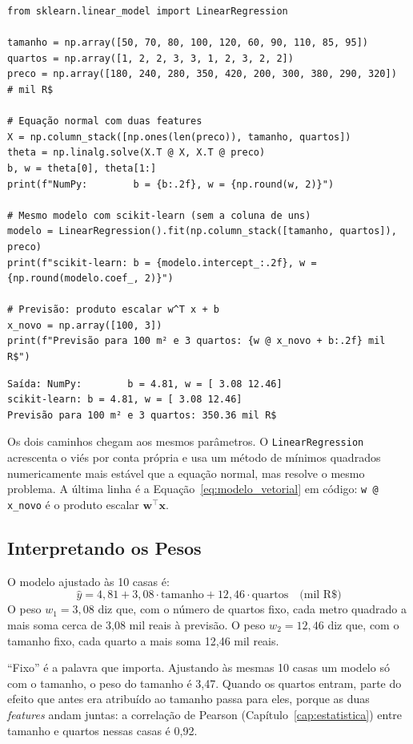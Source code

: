 \documentclass[a4paper,12pt,openany]{book}
\begin{document}
\begin{verbatim}
from sklearn.linear_model import LinearRegression

tamanho = np.array([50, 70, 80, 100, 120, 60, 90, 110, 85, 95])
quartos = np.array([1, 2, 2, 3, 3, 1, 2, 3, 2, 2])
preco = np.array([180, 240, 280, 350, 420, 200, 300, 380, 290, 320])  # mil R$

# Equação normal com duas features
X = np.column_stack([np.ones(len(preco)), tamanho, quartos])
theta = np.linalg.solve(X.T @ X, X.T @ preco)
b, w = theta[0], theta[1:]
print(f"NumPy:        b = {b:.2f}, w = {np.round(w, 2)}")

# Mesmo modelo com scikit-learn (sem a coluna de uns)
modelo = LinearRegression().fit(np.column_stack([tamanho, quartos]), preco)
print(f"scikit-learn: b = {modelo.intercept_:.2f}, w = {np.round(modelo.coef_, 2)}")

# Previsão: produto escalar w^T x + b
x_novo = np.array([100, 3])
print(f"Previsão para 100 m² e 3 quartos: {w @ x_novo + b:.2f} mil R$")
\end{verbatim}
\begin{verbatim}
Saída: NumPy:        b = 4.81, w = [ 3.08 12.46]
scikit-learn: b = 4.81, w = [ 3.08 12.46]
Previsão para 100 m² e 3 quartos: 350.36 mil R$
\end{verbatim}

Os dois caminhos chegam aos mesmos parâmetros. O \texttt{LinearRegression} acrescenta o viés por conta própria e usa um método de mínimos quadrados numericamente mais estável que a equação normal, mas resolve o mesmo problema. A última linha é a Equação~\ref{eq:modelo_vetorial} em código: \texttt{w @ x\_novo} é o produto escalar \(\mathbf{w}^\top\mathbf{x}\).

\subsection{Interpretando os Pesos}

O modelo ajustado às 10 casas é:
\[
\hat{y} = 4,81 + 3,08 \cdot \text{tamanho} + 12,46 \cdot \text{quartos} \quad \text{(mil R\$)}
\]
O peso \(w_1 = 3,08\) diz que, com o número de quartos fixo, cada metro quadrado a mais soma cerca de 3,08 mil reais à previsão. O peso \(w_2 = 12,46\) diz que, com o tamanho fixo, cada quarto a mais soma 12,46 mil reais.

``Fixo'' é a palavra que importa. Ajustando às mesmas 10 casas um modelo só com o tamanho, o peso do tamanho é 3,47. Quando os quartos entram, parte do efeito que antes era atribuído ao tamanho passa para eles, porque as duas \textit{features} andam juntas: a correlação de Pearson (Capítulo~\ref{cap:estatistica}) entre tamanho e quartos nessas casas é 0,92.
\end{document}
